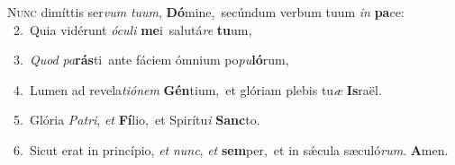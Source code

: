 \lettrine{\initial\textcolor{\initialcolor}{N}}{unc} dimíttis ser\textit{vum} \textit{tu}\-\textit{um}, \textbf{Dó}\-mine,~\star secúndum verbum tuum \textit{in} \textbf{pa}\-ce:\\
{\numbfont\textcolor{\numbcolor}{~2.}}~Quia vidérunt \textit{ó}\-\textit{cu}\textit{li} \textbf{me}\-i~\star salutá\textit{re} \textbf{tu}\-um,\par
{\numbfont\textcolor{\numbcolor}{~3.}}~\textit{Quod} \textit{pa}\-\textbf{rás}ti~\star ante fáciem ómnium po\-\textit{pu}\-\textbf{ló}rum,\par
{\numbfont\textcolor{\numbcolor}{~4.}}~Lumen ad revela\-\textit{ti}\-\textit{ó}\textit{nem} \textbf{Gén}\-tium,~\star et glóriam plebis tu\textit{æ} \textbf{Is}\-raël.\par
{\numbfont\textcolor{\numbcolor}{~5.}}~Glória \textit{Pa}\-\textit{tri}, \textit{et} \textbf{Fí}\-lio,~\star et Spirítu\textit{i} \textbf{Sanc}\-to.\par
{\numbfont\textcolor{\numbcolor}{~6.}}~Sicut erat in princípio, \textit{et} \textit{nunc}\-, \textit{et} \textbf{sem}\-per,~\star et in sǽcula sæculó\-\textit{rum}\-. \textbf{A}\-men.\par
